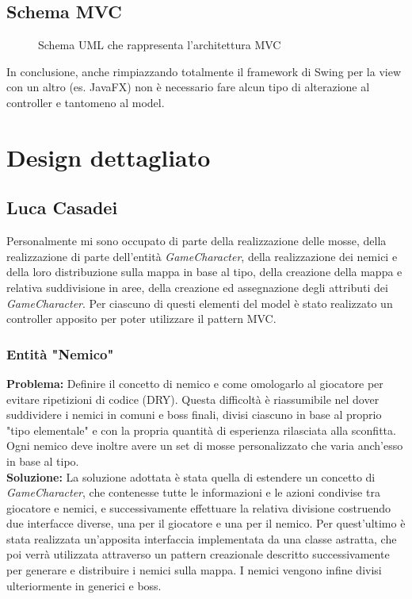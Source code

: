 \documentclass[a4paper,12pt]{report}
\begin{document}
\subsection{Schema MVC}
\begin{figure}[H]
	\centering
	
	\caption{Schema UML che rappresenta l'architettura MVC} 
	\label{fig:Schema UML che rappresenta l'architettura MVC}
\end{figure}

In conclusione, anche rimpiazzando totalmente il framework di Swing per la view con un altro (es. JavaFX) non è necessario fare alcun tipo di alterazione al controller e tantomeno al model.

\section{Design dettagliato}
\subsection*{Luca Casadei}
Personalmente mi sono occupato di parte della realizzazione delle mosse, della realizzazione di parte dell'entità \textit{GameCharacter}, della realizzazione dei nemici e della loro distribuzione sulla mappa in base al tipo, della creazione della mappa e relativa suddivisione in aree, della creazione ed assegnazione degli attributi dei \textit{GameCharacter}. Per ciascuno di questi elementi del model è stato realizzato un controller apposito per poter utilizzare il pattern MVC.
\subsubsection{Entità "Nemico"}
\textbf{Problema:} Definire il concetto di nemico e come omologarlo al giocatore per evitare ripetizioni di codice (DRY).
Questa difficoltà è riassumibile nel dover suddividere i nemici in comuni e boss finali, divisi ciascuno in base al proprio "tipo elementale" e con la propria quantità di esperienza rilasciata alla sconfitta. Ogni nemico deve inoltre avere un set di mosse personalizzato che varia anch'esso in base al tipo.\\
\textbf{Soluzione:} La soluzione adottata è stata quella di estendere un concetto di \textit{GameCharacter}, che contenesse tutte le informazioni e le azioni condivise tra giocatore e nemici, e successivamente effettuare la relativa divisione costruendo due interfacce diverse, una per il giocatore e una per il nemico. Per quest'ultimo è stata realizzata un'apposita interfaccia implementata da una classe astratta, che poi verrà utilizzata attraverso un pattern creazionale descritto successivamente per generare e distribuire i nemici sulla mappa. I nemici vengono infine divisi ulteriormente in generici e boss.
\end{document}

